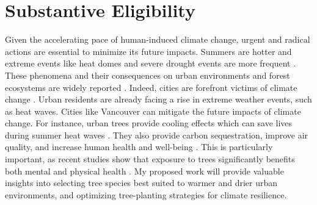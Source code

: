 \documentclass[11pt,letter]{article}
\begin{document}
\section *{Substantive Eligibility} 
Given the accelerating pace of human-induced climate change, urgent and radical actions are essential to minimize its future impacts. Summers are hotter and extreme events like heat domes and severe drought events are more frequent \citep{zhang_increased_2023}. These phenomena and their consequences on urban environments and forest ecosystems are widely reported \citep{allen_global_2010, mccarthy_climate_2010}. Indeed, cities are forefront victims of climate change \citep{das_unraveling_2024, corburn_cities_2009}. Urban residents are already facing a rise in extreme weather events, such as heat waves\citep{das_unraveling_2024}. Cities like Vancouver can mitigate the future impacts of climate change. For instance, urban trees provide cooling effects which can save lives during summer heat waves \citep{ettinger_street_2024, zandler_cooling_2024}. They also provide carbon sequestration, improve air quality, and increase human health and well-being \citep{wolf_urban_2020}. This is particularly important, as recent studies show that exposure to trees significantly benefits both mental and physical health  \citep{wolf_urban_2020, turnerskoff_benefits_2019}. My proposed work will provide valuable insights into selecting tree species best suited to warmer and drier urban environments, and optimizing tree-planting strategies for climate resilience.
\end{document}
